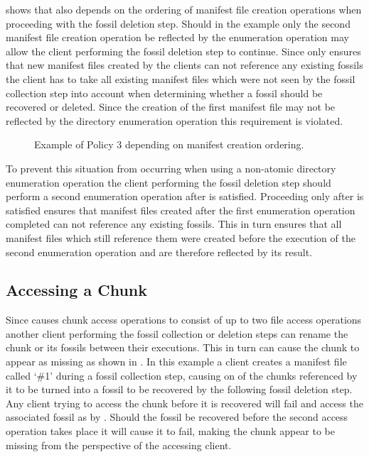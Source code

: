  shows that  also depends
on the ordering of manifest file creation operations when proceeding with
the fossil deletion step.
Should in the example only the second manifest file creation operation be reflected
by the enumeration operation  may allow the client performing
the fossil deletion step to continue.
Since  only ensures that new manifest files created by the
clients can not reference any existing fossils the client has to take all existing
manifest files which were not seen by the fossil collection step into account when
determining whether a fossil should be recovered or deleted.
Since the creation of the first manifest file may not be reflected by the directory
enumeration operation this requirement is violated.

\begin{figure}
    
    \caption{Example of Policy 3 depending on manifest creation ordering.}\label{fig:manifest-ordering}
\end{figure}

To prevent this situation from occurring when using a non-atomic directory enumeration
operation the client performing the fossil deletion step should perform a second enumeration
operation after  is satisfied.
Proceeding only after  is satisfied ensures that manifest
files created after the first enumeration operation completed can not reference
any existing fossils.
This in turn ensures that all manifest files which still reference them were
created before the execution of the second enumeration operation and are therefore
reflected by its result.

\subsection{Accessing a Chunk}

Since  causes chunk access operations to consist of up to
two file access operations another client performing the fossil collection or
deletion steps can rename the chunk or its fossils between their executions.
This in turn can cause the chunk to appear as missing as shown in .
In this example a client creates a manifest file called `\#1' during a fossil
collection step, causing on of the chunks referenced by it to be turned into a
fossil to be recovered by the following fossil deletion step.
Any client trying to access the chunk before it is recovered will fail and
access the associated fossil as by .
Should the fossil be recovered before the second access operation takes place
it will cause it to fail, making the chunk appear to be missing from the
perspective of the accessing client.

